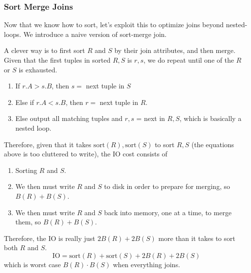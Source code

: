   \subsubsection{Sort Merge Joins}

    Now that we know how to sort, let's exploit this to optimize joins beyond nested-loops. We introduce a naive version of sort-merge join. 

    \begin{algo}
      A clever way is to first sort $R$ and $S$ by their join attributes, and then merge. Given that the first tuples in sorted $R, S$ is $r, s$, we do repeat until one of the $R$ or $S$ is exhausted. 
      \begin{enumerate}
        \item If $r.A > s.B$, then $s =$ next tuple in $S$ 
        \item Else if $r.A < s.B$, then $r =$ next tuple in $R$. 
        \item Else output all matching tuples and $r, s$ = next in $R, S$, which is basically a nested loop. 
      \end{enumerate}
      Therefore, given that it takes $\mathrm{sort}(R), \mathrm{sort}(S)$ to sort $R, S$ (the equations above is too cluttered to write), the IO cost consists of
      \begin{enumerate}
        \item Sorting $R$ and $S$. 
        \item We then must write $R$ and $S$ to disk in order to prepare for merging, so $B(R) + B(S)$. 
        \item We then must write $R$ and $S$ back into memory, one at a time, to merge them, so $B(R) + B(S)$. 
      \end{enumerate}
      Therefore, the IO is really just $2 B(R) + 2 B(S)$ more than it takes to sort both $R$ and $S$. 
      \begin{equation}
        \mathrm{IO} = \mathrm{sort}(R) + \mathrm{sort}(S) + 2 B(R) + 2 B(S)
      \end{equation}
      which is worst case $B(R) \cdot B(S)$ when everything joins. 
      \begin{algorithm}[H]
        \caption{}
        \label{alg:}
        \begin{algorithmic}
          \Require{}
          \State 
          \EndFunction
        \end{algorithmic}
      \end{algorithm}
    \end{algo}

